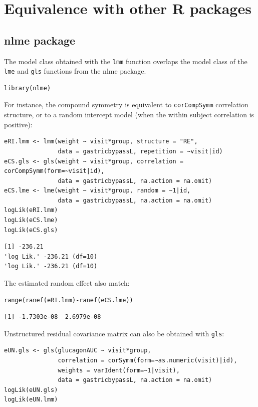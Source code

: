 \documentclass[12pt]{article}
\begin{document}
\clearpage

\section{Equivalence with other R packages}
\label{sec:orgaabfd00}

\subsection{nlme package}
\label{sec:org1adb80b}

The model class obtained with the \texttt{lmm} function overlaps the model
class of the \texttt{lme} and \texttt{gls} functions from the nlme package.
\lstset{language=r,label= ,caption= ,captionpos=b,numbers=none}
\begin{lstlisting}
library(nlme)
\end{lstlisting}

For instance, the compound symmetry is equivalent to \texttt{corCompSymm}
correlation structure, or to a random intercept model (when the within
subject correlation is positive):
\lstset{language=r,label= ,caption= ,captionpos=b,numbers=none}
\begin{lstlisting}
eRI.lmm <- lmm(weight ~ visit*group, structure = "RE",
               data = gastricbypassL, repetition = ~visit|id)
eCS.gls <- gls(weight ~ visit*group, correlation = corCompSymm(form=~visit|id),
               data = gastricbypassL, na.action = na.omit)
eCS.lme <- lme(weight ~ visit*group, random = ~1|id,
               data = gastricbypassL, na.action = na.omit)
logLik(eRI.lmm)
logLik(eCS.lme)
logLik(eCS.gls)
\end{lstlisting}

\begin{verbatim}
[1] -236.21
'log Lik.' -236.21 (df=10)
'log Lik.' -236.21 (df=10)
\end{verbatim}


The estimated random effect also match:
\lstset{language=r,label= ,caption= ,captionpos=b,numbers=none}
\begin{lstlisting}
range(ranef(eRI.lmm)-ranef(eCS.lme))
\end{lstlisting}

\begin{verbatim}
[1] -1.7303e-08  2.6979e-08
\end{verbatim}


Unstructured residual covariance matrix can also be obtained with
\texttt{gls}:
\lstset{language=r,label= ,caption= ,captionpos=b,numbers=none}
\begin{lstlisting}
eUN.gls <- gls(glucagonAUC ~ visit*group,
               correlation = corSymm(form=~as.numeric(visit)|id),
               weights = varIdent(form=~1|visit),
               data = gastricbypassL, na.action = na.omit)
logLik(eUN.gls)
logLik(eUN.lmm)
\end{lstlisting}
\end{document}
